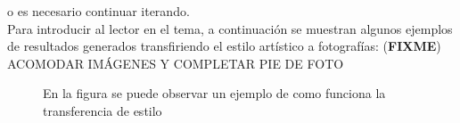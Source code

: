 \documentclass[a4paper,11pt,spanish]{book}
\newcommand*{\FIXME}[1]{{(\textbf{FIXME}) {#1}}}
\begin{document}
    o es necesario continuar iterando. \\
    Para introducir al lector en el tema, a continuación se muestran algunos ejemplos de resultados generados transfiriendo el estilo artístico a fotografías:
    \FIXME{ACOMODAR IMÁGENES Y COMPLETAR PIE DE FOTO}
    \begin{figure}[h]




    \caption{En la figura se puede observar un ejemplo de como funciona la transferencia de estilo}
    \label{fig:style_transfer_candy_tower}
    \end{figure}
\end{document}
